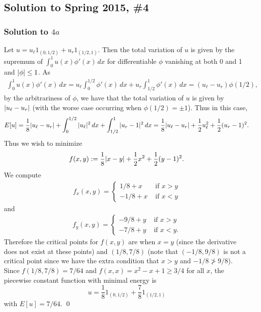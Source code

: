 \subsection*{Solution to Spring 2015, \#4}\label{s154}

\subsubsection*{Solution to $4a$}
Let $u = u_{\ell}1_{(0, 1/2)} + u_{r}1_{(1/2, 1)}$. Then the total variation of $u$ is given by
the supremum of $\int_{0}^{1}u(x)\phi'(x)\, dx$ for differentiable $\phi$ vanishing at both 0 and 1 and $|\phi| \leq 1$.
As
\begin{align*}
\int_{0}^{1}u(x)\phi'(x)\, dx = u_{\ell}\int_{0}^{1/2}\phi'(x)\, dx + u_{r}\int_{1/2}^{1}\phi'(x)\, dx = (u_{\ell} - u_{r})\phi(1/2),
\end{align*}
by the arbitrariness of $\phi$, we have that the total variation of $u$ is given by $|u_{\ell} - u_{r}|$ (with the worse case occurring
when $\phi(1/2) = \pm 1$). Thus in this case,
\begin{align*}
E[u] = \frac{1}{8}|u_{\ell} - u_{r}| + \int_{0}^{1/2}|u_{\ell}|^{2}\, dx + \int_{1/2}^{1} |u_{r} - 1|^{2}\, dx = \frac{1}{8}|u_{\ell} - u_{r}| + \frac{1}{2}u_{\ell}^{2} + \frac{1}{2}(u_{r} - 1)^{2}.
\end{align*}
Thus we wish to minimize
$$f(x, y) := \frac{1}{8}|x - y| + \frac{1}{2}x^{2} + \frac{1}{2}(y - 1)^{2}.$$
We compute
\begin{align*}
f_{x}(x, y) =
\begin{cases}
1/8 + x & \text{ if } x > y\\
-1/8 + x & \text{ if } x < y
\end{cases}
\end{align*}
and
\begin{align*}
f_{y}(x, y) =
\begin{cases}
-9/8 + y & \text{ if } x > y\\
-7/8 + y & \text{ if } x < y.
\end{cases}
\end{align*}
Therefore the critical points for $f(x, y)$ are when $x = y$ (since the derivative does not exist at these points)
and $(1/8, 7/8)$ (note that $(-1/8, 9/8)$ is not a critical point since we have the extra condition that $x > y$ and $-1/8 \not> 9/8$).
Since $f(1/8, 7/8) = 7/64$ and $f(x, x) = x^{2} - x + 1 \geq 3/4$ for all $x$, the piecewise constant function with minimal energy is
$$u = \frac{1}{8}1_{(0, 1/2)} + \frac{7}{8}1_{(1/2, 1)}$$
with $E[u] = 7/64$.
\hfill\qed

